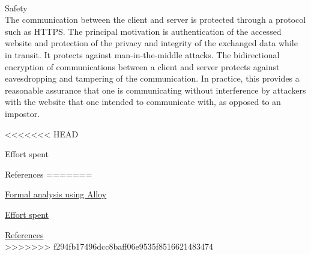 \documentclass{article}
\begin{document}
\begin{legal}
\begin{legal}
\begin{legal}
			\\
			\item Safety\\
			{\normalfont The communication between the client and server is protected through a protocol such as HTTPS. The principal motivation is authentication of the accessed website and protection of the privacy and integrity of the exchanged data while in transit. It protects against man-in-the-middle attacks. The bidirectional encryption of communications between a client and server protects against eavesdropping and tampering of the communication. In practice, this provides a reasonable assurance that one is communicating without interference by attackers with the website that one intended to communicate with, as opposed to an impostor. }
			\\
		\end{legal}
		\end{legal}
<<<<<<< HEAD
	\item Effort spent

	\item References
=======
	\item \underline{Formal analysis using Alloy}\\
	\item \underline{Effort spent}\\
	\item \underline{References}\\
>>>>>>> f294fb17496dcc8baff06e9535f8516621483474
	\end{legal}
\end{document}
